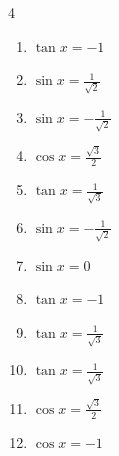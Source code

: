 \begin{multicols}{4}
\begin{enumerate}
  \item $\displaystyle \tan{x}  = -1$


  \item $\displaystyle \sin{x}  = \frac{1}{\sqrt{2}}$


  \item $\displaystyle \sin{x}  = -\frac{1}{\sqrt{2}}$


  \item $\displaystyle \cos{x}  = \frac{\sqrt{3}}{2}$


  \item $\displaystyle \tan{x}  = \frac{1}{\sqrt{3}}$


  \item $\displaystyle \sin{x}  = -\frac{1}{\sqrt{2}}$


  \item $\displaystyle \sin{x}  = 0$


  \item $\displaystyle \tan{x}  = -1$


  \item $\displaystyle \tan{x}  = \frac{1}{\sqrt{3}}$


  \item $\displaystyle \tan{x}  = \frac{1}{\sqrt{3}}$


  \item $\displaystyle \cos{x}  = \frac{\sqrt{3}}{2}$


  \item $\displaystyle \cos{x}  = -1$


\end{enumerate}
\end{multicols}
